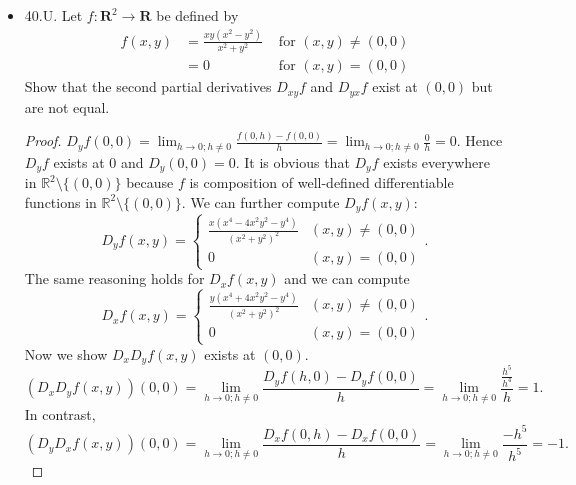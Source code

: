 \begin{itemize}
	
\item 40.U. Let $f: \boldsymbol{R}^2 \rightarrow \boldsymbol{R}$ be defined by
\[
\begin{array}{rlr}
f(x, y) & =\frac{x y\left(x^2-y^2\right)}{x^2+y^2} & \text { for }(x, y) \neq(0,0) \\
& =0 & \text { for }(x, y)=(0,0)
\end{array}
\]
Show that the second partial derivatives $D_{x y} f$ and $D_{y x} f$ exist at $(0,0)$ but are not equal.
\begin{proof}
	$D_y f(0,0) = \lim_{h \to 0; h\neq 0} \frac{f(0,h) - f(0,0)}{h} = \lim_{h \to 0; h\neq 0} \frac{0}{h} = 0$.
	Hence $D_yf$ exists at $0$ and $D_y(0,0) = 0$. It is obvious that $D_y f$ exists everywhere in $\mathbb{R}^2 \setminus \{(0,0)\} $ because $f$ is composition of well-defined differentiable functions in $\mathbb{R}^2 \setminus \{(0,0)\} $. We can further compute $D_yf(x,y)$:
	 \[
		D_y f(x,y) = \begin{cases}
			\frac{x\left(x^4-4 x^2 y^2-y^4\right)}{\left(x^2+y^2\right)^2} & (x,y) \neq (0,0)\\
			0 & (x,y) = (0,0)
		\end{cases}
	.\] 
	The same reasoning holds for $D_x f(x,y)$ and we can compute
	\[
		D_x f(x,y) = \begin{cases}
			\frac{y\left(x^4+4 x^2 y^2-y^4\right)}{\left(x^2+y^2\right)^2} & (x,y) \neq (0,0) \\
			0 & (x,y) = (0,0)
		\end{cases}
	.\] 
	Now we show $D_x D_yf(x,y)$ exists at $(0,0)$. 
	\[
		\left(D_x D_y f(x,y)\right)(0,0) = \lim_{h \to  0;h\neq 0} \frac{D_yf(h, 0) - D_yf(0,0)}{h} = \lim_{h \to 0;h\neq 0} \frac{\frac{h^5}{h^4}}{h} = 1
	.\] 
	In contrast,
	\[
		\left(D_y D_x f(x,y)\right)(0,0) = \lim_{h \to 0; h\neq 0} \frac{D_xf(0,h) - D_xf(0,0)}{h} = \lim_{h \to 0;h\neq 0} \frac{-h^5}{h^5} = -1
	.\] 
\end{proof}

\end{itemize}
